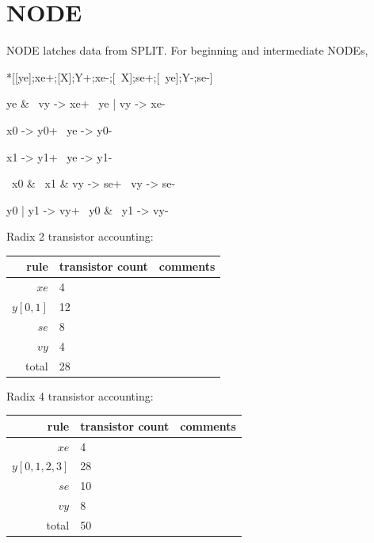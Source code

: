 \documentclass{article}
\begin{document}
\section{NODE \label{sec:DESERIAL_CHAIN_NODE}}

NODE latches data from SPLIT. For beginning and intermediate NODEs,

\begin{hse}
*[[ye];xe+;[X];Y+;xe-;[~X];se+;[~ye];Y-;se-]
\end{hse}

\begin{prs2}
ye & ~vy -> xe+
~ye | vy -> xe-
\end{prs2}

\begin{prs2}
x0 -> y0+
~ye -> y0-

x1 -> y1+
~ye -> y1-
\end{prs2}

\begin{prs2}
~x0 & ~x1 & vy -> se+
~vy -> se-
\end{prs2}

\begin{prs2}
y0 | y1 -> vy+
~y0 & ~y1 -> vy-
\end{prs2}

\noindent
Radix 2 transistor accounting:

\begin{center}
    \begin{tabular}{|r|l|l|}
    \hline
    rule & transistor count & comments \\ \hline
    $xe$ & 4 & \\ \hline
    $y[0,1]$ & 12 & \\ \hline
    $se$ & 8 & \\ \hline
    $vy$ & 4 & \\ \hline
    \hline total & 28 & \\ \hline
    \end{tabular}
\end{center}

\noindent
Radix 4 transistor accounting:

\begin{center}
    \begin{tabular}{|r|l|l|}
    \hline
    rule & transistor count & comments \\ \hline
    $xe$ & 4 & \\ \hline
    $y[0,1,2,3]$ & 28 & \\ \hline
    $se$ & 10 & \\ \hline
    $vy$ & 8 & \\ \hline
    \hline total & 50 & \\ \hline
    \end{tabular}
\end{center}
\end{document}
